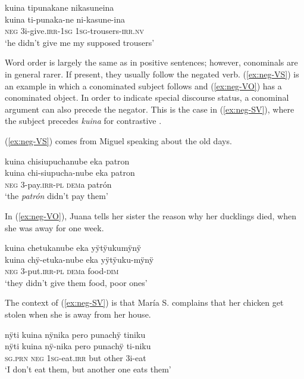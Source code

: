 \ea\label{ex:neg-dit}
\begingl 
\glpreamble kuina tipunakane nikasuneina\\
\gla kuina ti-punaka-ne ni-kasune-ina\\ 
\glb \textsc{neg} 3i-give.\textsc{irr}-1\textsc{sg} 1\textsc{sg}-trousers-\textsc{irr.nv}\\ 
\glft ‘he didn’t give me my supposed trousers’
\trailingcitation{[mqx-p110826l.458]}
\xe

Word order is largely the same as in positive sentences; however, conominals are in general rarer. If present, they usually follow the negated verb. (\ref{ex:neg-VS}) is an example in which a conominated subject follows and (\ref{ex:neg-VO}) has a conominated object. In order to indicate special discourse status, a conominal argument can also precede the negator. This is the case in (\ref{ex:neg-SV}), where the subject precedes \textit{kuina} for contrastive .

(\ref{ex:neg-VS}) comes from Miguel speaking about the old days.

\ea\label{ex:neg-VS}
\begingl
\glpreamble kuina chisiupuchanube eka patron\\
\gla  kuina chi-siupucha-nube eka patron\\
\glb \textsc{neg} 3-pay.\textsc{irr}-\textsc{pl} \textsc{dem}a patrón\\
\glft ‘the \textit{patrón} didn’t pay them’
\endgl
\trailingcitation{[mxx-p110825l.042]}
\xe

In (\ref{ex:neg-VO}), Juana tells her sister the reason why her ducklings died, when she was away for one week. 

\ea\label{ex:neg-VO}
\begingl
\glpreamble kuina chetukanube eka yÿtÿukumÿnÿ \\
\gla kuina chÿ-etuka-nube eka yÿtÿuku-mÿnÿ \\
\glb \textsc{neg} 3-put.\textsc{irr}-\textsc{pl} \textsc{dem}a food-\textsc{dim}\\
\glft ‘they didn’t give them food, poor ones’
\endgl
{}
\xe
{}

The context of (\ref{ex:neg-SV}) is that María S. complains that her chicken get stolen when she is away from her house.

\ea\label{ex:neg-SV}
\begingl
\glpreamble nÿti kuina nÿnika pero punachÿ tiniku\\
\gla nÿti kuina nÿ-nika pero punachÿ ti-niku\\
\textsc{sg.prn} \textsc{neg} 1\textsc{sg}-eat.\textsc{irr} but other 3i-eat\\
\glft ‘I don’t eat them, but another one eats them’
\endgl
\trailingcitation{[rxx-e120511l.181]}
\xe

